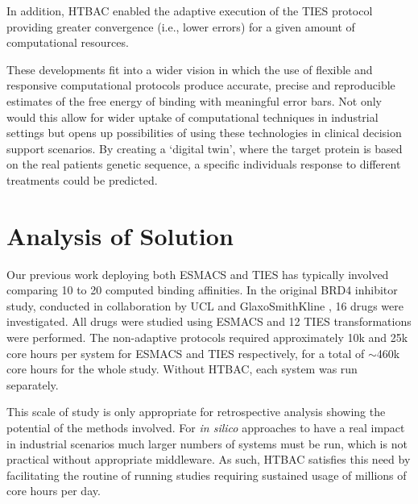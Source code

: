 \documentclass[conference]{IEEEtran}
\begin{document}
In addition, HTBAC enabled the adaptive execution of the TIES protocol providing 
greater convergence (i.e., lower errors) for a given amount of computational 
resources.

These developments fit into a wider vision in which the use of
flexible and responsive computational protocols produce accurate,
precise and reproducible estimates of the free energy of binding with
meaningful error bars. Not only would this allow for wider uptake of
computational techniques in industrial settings but opens up possibilities
of using these technologies in clinical decision support scenarios. By creating
a `digital twin', where the target protein is based on the real patients
genetic sequence, a specific individuals response to different
treatments could be predicted.



\section{Analysis of Solution}\label{sec:analysis}

Our previous work deploying both ESMACS and TIES has typically involved 
comparing 10 to 20 computed binding affinities. In the original BRD4 inhibitor 
study, conducted in collaboration by UCL and GlaxoSmithKline \cite{Wan2017brd4}, 
16 drugs were investigated. All drugs were studied using ESMACS and 12 TIES 
transformations were performed. The non-adaptive protocols required 
approximately 10k and 25k core hours per system for ESMACS and TIES 
respectively, for a total of $\sim$460k core hours for the whole study. Without 
HTBAC, each system was run separately. 

This scale of study is only appropriate for 
retrospective analysis showing the potential of the methods involved. For 
\textit{in silico} approaches to have a real impact in industrial scenarios much 
larger numbers of systems must be run, which is not practical without 
appropriate middleware. As such, HTBAC satisfies this need by facilitating the 
routine of running studies requiring sustained usage of millions of core hours 
per day.
\end{document}
